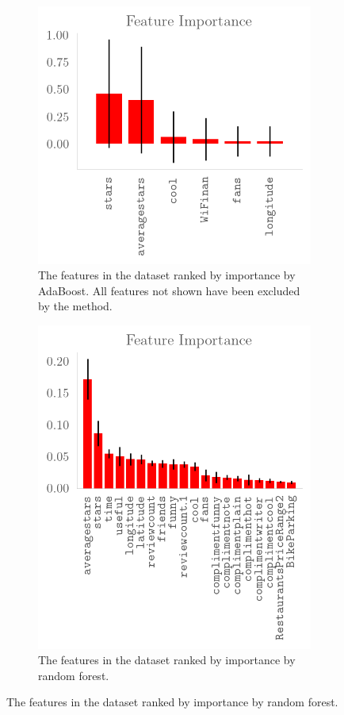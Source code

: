 \begin{figure}[H]
    \begin{subfigure}
        \centering
        \includegraphics{Figures/ada_feature_importance.png}
        \caption{The features in the dataset ranked by importance by AdaBoost.
        All features not shown have been excluded by the method.}
    \end{subfigure}
    \begin{subfigure}
        \centering
        \includegraphics{Figures/randforest_feature_importance.png}
        \caption{The features in the dataset ranked by importance by random forest.}
    \end{subfigure}
    \label{fig:featureselect}
\end{figure}

